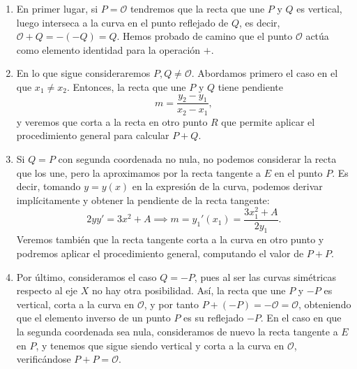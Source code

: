 \documentclass[
  a4paper,
  12pt,
  spanish,
]{scrartcl}
\begin{document}
\begin{enumerate}
    \item En primer lugar, si $P=\mathcal{O}$ tendremos que la recta que une $P$ y $Q$ es vertical, luego interseca a la curva en el punto reflejado de $Q$, es decir, $\mathcal{O} + Q = - (-Q) = Q$. Hemos probado de camino que el punto $\mathcal{O}$ actúa como elemento identidad para la operación $+$.
    \item En lo que sigue consideraremos $P, Q \neq \mathcal{O}$. Abordamos primero el caso en el que $x_1 \neq x_2$. Entonces, la recta que une $P$ y $Q$ tiene pendiente \[ m = \frac{y_2 - y_1}{x_2 - x_1}, \] y veremos que corta a la recta en otro punto $R$ que permite aplicar el procedimiento general para calcular $P+Q$.	
    \item Si $Q = P$ con segunda coordenada no nula, no podemos considerar la recta que los une, pero la aproximamos por la recta tangente a $E$ en el punto $P$. Es decir, tomando $y = y(x)$ en la expresión de la curva, podemos derivar implícitamente y obtener la pendiente de la recta tangente: \[ 2yy' = 3x^2 + A \implies m = y_1'(x_1) = \frac{3x_1^2 + A}{2y_1}. \]  Veremos también que la recta tangente corta a la curva en otro punto y podremos aplicar el procedimiento general, computando el valor de $P + P$.
    \item Por último, consideramos el caso $Q = -P$, pues al ser las curvas simétricas respecto al eje $X$ no hay otra posibilidad. Así, la recta que une $P$ y $-P$ es vertical, corta a la curva en $\mathcal{O}$, y por tanto $P + (-P) = -\mathcal{O} = \mathcal{O}$, obteniendo que el elemento inverso de un punto $P$ es su reflejado $-P$. En el caso en que la segunda coordenada sea nula, consideramos de nuevo la recta tangente a $E$ en $P$, y tenemos que sigue siendo vertical y corta a la curva en $\mathcal{O}$, verificándose $P + P = \mathcal{O}$.
\end{enumerate}
\end{document}
